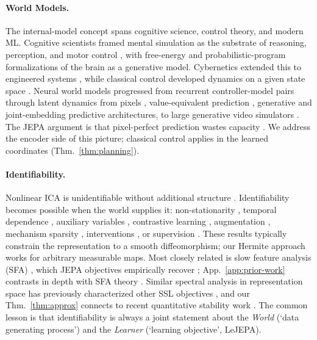 \documentclass{article}
\begin{document}
\paragraph{World Models.} The internal-model concept spans cognitive science, control theory, and modern ML. Cognitive scientists framed mental simulation as the substrate of reasoning, perception, and motor control \citep{craik1943,tolman1948,johnson_laird_1983,wolpert1995internal,gregory1980perceptions}, with free-energy \citep{friston2010free} and probabilistic-program \citep{lake2015human} formalizations of the brain as a generative model. Cybernetics extended this to engineered systems \citep{conant1970good,francis1976}, while classical control developed dynamics on a given state space \citep{bellman1957,kalman1960}. Neural world models progressed from recurrent controller-model pairs \citep{nguyen1990neural,schmidhuber1990making,sutton1990dyna} through latent dynamics from pixels \citep{watter2015embed,oh2015action,finn2016unsupervised,ha2018world,hafner2019planet}, value-equivalent prediction \citep{schrittwieser2020mastering}, generative \citep{hafner2025dreamerv3} and joint-embedding predictive \citep{lecun2022,maes2026leworldmodel} architectures, to large generative video simulators \citep{brooks2024sora,bruce2024genie}. The JEPA argument is that pixel-perfect prediction wastes capacity \citep{lecun2022}. We address the encoder side of this picture; classical control applies in the learned coordinates (Thm.~\ref{thm:planning}).


\paragraph{Identifiability.} Nonlinear ICA is unidentifiable without additional structure \citep{hyvarinen1999,locatello2019}. Identifiability becomes possible when the world supplies it: non-stationarity \citep{hyvarinen2016}, temporal dependence \citep{hyvarinen2017,klindt2021}, auxiliary variables \citep{khemakhem2020,hyvarinen_nonlinear_2019}, contrastive learning \citep{zimmermann2021}, augmentation \citep{vonkugelgen2021}, mechanism sparsity \citep{lachapelle2022}, interventions \citep{ahuja2023,buchholz2024}, or supervision \citep{reizinger2024cross,roeder2021linear}. These results typically constrain the representation to a smooth diffeomorphism; our Hermite approach works for arbitrary measurable maps. Most closely related is slow feature analysis (SFA) \citep{wiskott2002}, which JEPA objectives empirically recover \citep{sobal2022slow}; App.~\ref{app:prior-work} contrasts in depth with SFA theory \citep{sprekeler2014}. %
Similar spectral analysis in representation space has previously characterized other SSL objectives \citep{balestriero2022contrastivenoncontrastiveselfsupervisedlearning}, and our Thm.~\ref{thm:approx} connects to recent quantitative stability work \citep{buchholz2025robustness,nielsen2025does}. The common lesson is that identifiability is always a joint statement about the \textit{World} (`data generating process') and the \textit{Learner} (`learning objective', LeJEPA).
\end{document}
